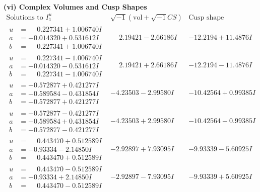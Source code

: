 \documentclass[1p]{elsarticle_modified}
\theoremstyle{definition}
\newcommand{\I}{\sqrt{-1}}
\begin{document}
\newpage\flushleft \textbf{(vi) Complex Volumes and Cusp Shapes}
$$\begin{array}{c|c|c}  
\text{Solutions to }I^u_{1}& \I (\text{vol} + \sqrt{-1}CS) & \text{Cusp shape}\\
 \hline 
\begin{aligned}
u &= \phantom{-}0.227341 + 1.006740 I \\
a &= -0.014320 + 0.531612 I \\
b &= \phantom{-}0.227341 + 1.006740 I\end{aligned}
 & \phantom{-}2.19421 - 2.66186 I & -12.2194 + 11.4876 I \\ \hline\begin{aligned}
u &= \phantom{-}0.227341 - 1.006740 I \\
a &= -0.014320 - 0.531612 I \\
b &= \phantom{-}0.227341 - 1.006740 I\end{aligned}
 & \phantom{-}2.19421 + 2.66186 I & -12.2194 - 11.4876 I \\ \hline\begin{aligned}
u &= -0.572877 + 0.421277 I \\
a &= -0.589584 - 0.431854 I \\
b &= -0.572877 + 0.421277 I\end{aligned}
 & -4.23503 - 2.99580 I & -10.42564 + 0.99385 I \\ \hline\begin{aligned}
u &= -0.572877 - 0.421277 I \\
a &= -0.589584 + 0.431854 I \\
b &= -0.572877 - 0.421277 I\end{aligned}
 & -4.23503 + 2.99580 I & -10.42564 - 0.99385 I \\ \hline\begin{aligned}
u &= \phantom{-}0.443470 + 0.512589 I \\
a &= -0.93334 - 2.14850 I \\
b &= \phantom{-}0.443470 + 0.512589 I\end{aligned}
 & -2.92897 + 7.93095 I & -9.93339 - 5.60925 I \\ \hline\begin{aligned}
u &= \phantom{-}0.443470 - 0.512589 I \\
a &= -0.93334 + 2.14850 I \\
b &= \phantom{-}0.443470 - 0.512589 I\end{aligned}
 & -2.92897 - 7.93095 I & -9.93339 + 5.60925 I \\ \hline\begin{aligned}

\end{aligned}
\end{array}$$
\end{document}
